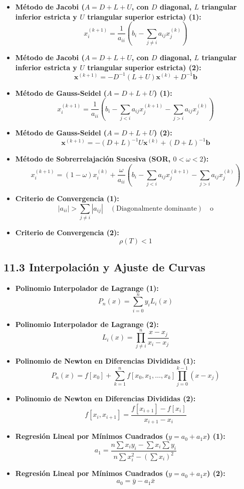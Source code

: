 \documentclass[11pt,a4paper]{article}
\begin{document}
\begin{itemize}
  \item \textbf{Método de Jacobi ($A = D + L + U$, con $D$ diagonal, $L$ triangular inferior estricta y $U$ triangular superior estricta) (1):}
  \[
    x_i^{(k+1)} = \frac{1}{a_{ii}} \left( b_i - \sum_{j \ne i} a_{ij}x_j^{(k)} \right)
  \]
  \item \textbf{Método de Jacobi ($A = D + L + U$, con $D$ diagonal, $L$ triangular inferior estricta y $U$ triangular superior estricta) (2):}
  \[
    \mathbf{x}^{(k+1)} = -D^{-1}(L + U)\mathbf{x}^{(k)} + D^{-1}\mathbf{b}
  \]
  \item \textbf{Método de Gauss-Seidel ($A = D + L + U$) (1):}
  \[
    x_i^{(k+1)} = \frac{1}{a_{ii}} \left( b_i - \sum_{j < i} a_{ij}x_j^{(k+1)} - \sum_{j > i} a_{ij}x_j^{(k)} \right)
  \]
  \item \textbf{Método de Gauss-Seidel ($A = D + L + U$) (2):}
  \[
    \mathbf{x}^{(k+1)} = -(D + L)^{-1} U \mathbf{x}^{(k)} + (D + L)^{-1} \mathbf{b}
  \]
  \item \textbf{Método de Sobrerrelajación Sucesiva (SOR, $0 < \omega < 2$):}
  \[
    x_i^{(k+1)} = (1 - \omega)x_i^{(k)} + \frac{\omega}{a_{ii}} \left( b_i - \sum_{j < i} a_{ij}x_j^{(k+1)} - \sum_{j > i} a_{ij}x_j^{(k)} \right)
  \]
  \item \textbf{Criterio de Convergencia (1):}
  \[
    |a_{ii}| > \sum_{j \ne i} |a_{ij}| \quad (\text{Diagonalmente dominante}) \quad \text{o}
  \]
  \item \textbf{Criterio de Convergencia (2):}
  \[
    \rho(T) < 1
  \]
\end{itemize}

\subsection*{11.3 Interpolación y Ajuste de Curvas}

\begin{itemize}
  \item \textbf{Polinomio Interpolador de Lagrange (1):}
  \[
    P_n(x) = \sum_{i=0}^n y_i L_i(x)
  \]
  \item \textbf{Polinomio Interpolador de Lagrange (2):}
  \[
    L_i(x) = \prod_{j \ne i}^n \frac{x - x_j}{x_i - x_j}
  \]
  \item \textbf{Polinomio de Newton en Diferencias Divididas (1):}
  \[
    P_n(x) = f[x_0] + \sum_{k=1}^n f[x_0, x_1, \dots, x_k] \prod_{j=0}^{k-1} (x - x_j)
  \]
  \item \textbf{Polinomio de Newton en Diferencias Divididas (2):}
  \[
    f[x_i, x_{i+1}] = \frac{f[x_{i+1}] - f[x_i]}{x_{i+1} - x_i}
  \]
  \item \textbf{Regresión Lineal por Mínimos Cuadrados ($y = a_0 + a_1 x$) (1):}
  \[
    a_1 = \frac{n \sum x_i y_i - \sum x_i \sum y_i}{n \sum x_i^2 - (\sum x_i)^2}
  \]
  \item \textbf{Regresión Lineal por Mínimos Cuadrados ($y = a_0 + a_1 x$) (2):}
  \[
    a_0 = \bar{y} - a_1 \bar{x}
  \]
\end{itemize}
\end{document}
